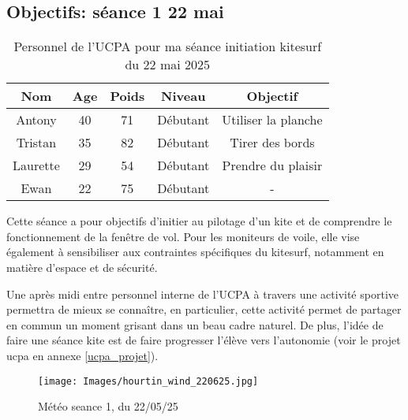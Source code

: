 \documentclass[11pt,a4paper]{report}
\begin{document}
\subsection{Objectifs: séance 1 22 mai}
\begin{table}[h]
\centering
\begin{tabular}{|c|c|c|c|c|}
        \hline
        \textbf{Nom} & \textbf{Age} & \textbf{Poids}& \textbf{Niveau}     &  \textbf{Objectif} \\ 
        \hline
        Antony        &  40          &  71           &   Débutant          & Utiliser la planche  \\
        Tristan       &  35          & 82            &  Débutant           & Tirer des bords  \\
        Laurette      &  29          & 54            &  Débutant           & Prendre du plaisir \\
        Ewan          &  22          & 75            & Débutant            &  -  \\
        \hline
\end{tabular}
\caption{Personnel de l'UCPA pour ma séance initiation kitesurf du 22 mai 2025\label{stagiaires_table}}
\end{table}
Cette séance a pour objectifs d’initier au pilotage d’un kite et
de comprendre le fonctionnement de la fenêtre de vol. 
Pour les moniteurs de voile, elle vise également à 
sensibiliser aux contraintes spécifiques du kitesurf, 
notamment en matière d’espace et de sécurité.
 
Une après midi entre personnel interne de l'UCPA à travers une 
activité sportive permettra  de mieux se connaître, 
en particulier, cette activité permet de partager en commun
un moment grisant dans un beau cadre naturel. De plus, l'idée
de faire une séance kite est de faire progresser l'élève vers 
l'autonomie (voir le projet ucpa en annexe \ref{ucpa_projet}).


\begin{figure}
\centering
\texttt{[image: Images/hourtin\_wind\_220625.jpg]} 
\caption{Météo seance 1, du 22/05/25\label{meteo}}
\end{figure}

\end{document}
